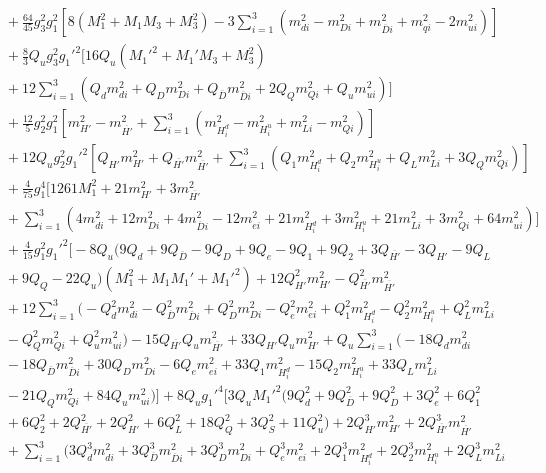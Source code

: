 \documentclass[preprint,amsmath,amssymb,aps,superscriptaddress,prd,showpacs,floatfix,nofootinbib]{revtex4-1}
\begin{document}
\begin{subequations}
\begin{align}
&{}+\frac{64}{45}g_3^2g_1^2\left [ 8\left (M_1^2+M_1M_3+M_3^2\right )-3\sum_{i=1}^3\left ( m_{di}^2-m_{Di}^2+m_{\overline{D}i}^2+m_{qi}^2-2m_{ui}^2\right )\right ]\nonumber\\
&{}+\frac{8}{3}Q_ug_3^2g_1'^2\bigg [ 16Q_u\left (M_1'^2+M_1'M_3+M_3^2\right )\nonumber\\
&{}+12\sum_{i=1}^3\left ( Q_dm_{di}^2+Q_Dm_{Di}^2+Q_{\overline{D}}m_{\overline{D}i}^2+2Q_Qm_{Qi}^2+Q_um_{ui}^2\right )\bigg ]\nonumber\\
&{}+\frac{12}{5}g_2^2g_1^2\left [ m_{H'}^2-m_{\overline{H'}}^2+\sum_{i=1}^3\left ( m_{H_i^d}^2-m_{H_i^u}^2+m_{Li}^2-m_{Qi}^2\right )\right ]\nonumber\\
&{}+12Q_ug_2^2g_1'^2\left [ Q_{H'}m_{H'}^2+Q_{\overline{H'}}m_{\overline{H'}}^2+\sum_{i=1}^3\left ( Q_1m_{H_i^d}^2+Q_2m_{H_i^u}^2+Q_Lm_{Li}^2+3Q_Qm_{Qi}^2\right )\right ]\nonumber\\
&{}+\frac{4}{75}g_1^4\bigg [ 1261M_1^2+21m_{H'}^2+3m_{\overline{H'}}^2\nonumber\\
&{}+\sum_{i=1}^3\left ( 4m_{di}^2+12m_{Di}^2+4m_{\overline{D}i}^2-12m_{ei}^2+21m_{H_i^d}^2+3m_{H_i^u}^2+21m_{Li}^2+3m_{Qi}^2+64m_{ui}^2\right )\bigg ]\nonumber\\
&{}+\frac{4}{15}g_1^2g_1'^2\bigg [ -8Q_u\big ( 9Q_d+9Q_{\overline{D}}-9Q_D+9Q_e-9Q_1+9Q_2+3Q_{\overline{H'}}-3Q_{H'}-9Q_L\nonumber\\
&{}+9Q_Q-22Q_u\big )\left ( M_1^2+M_1M_1'+M_1'^2 \right )+12Q_{H'}^2m_{H'}^2-Q_{\overline{H'}}^2m_{\overline{H'}}^2\nonumber\\
&{}+12\sum_{i=1}^3\big ( -Q_d^2m_{di}^2-Q_{\overline{D}}^2m_{\overline{D}i}^2+Q_D^2m_{Di}^2-Q_e^2m_{ei}^2+Q_1^2m_{H_i^d}^2-Q_2^2m_{H_i^u}^2+Q_L^2m_{Li}^2\nonumber\\
&{}-Q_Q^2m_{Qi}^2+Q_u^2m_{ui}^2\big )-15Q_{\overline{H'}}Q_um_{\overline{H'}}^2+33Q_{H'}Q_um_{H'}^2+Q_u\sum_{i=1}^3\big ( -18Q_dm_{di}^2\nonumber\\
&{}-18Q_{\overline{D}}m_{\overline{D}i}^2+30Q_Dm_{Di}^2-6Q_em_{ei}^2+33Q_1m_{H_i^d}^2-15Q_2m_{H_i^u}^2+33Q_Lm_{Li}^2\nonumber\\
&{}-21Q_Qm_{Qi}^2+84Q_um_{ui}^2\big )\bigg ]+8Q_ug_1'^4\bigg [ 3Q_uM_1'^2\big ( 9Q_d^2+9Q_{\overline{D}}^2+9Q_D^2+3Q_e^2+6Q_1^2\nonumber\\
&{}+6Q_2^2+2Q_{\overline{H'}}^2+2Q_{H'}^2+6Q_L^2+18Q_Q^2+3Q_S^2+11Q_u^2 \big )+2Q_{H'}^3m_{H'}^2+2Q_{\overline{H'}}^3m_{\overline{H'}}^2\nonumber\\
&{}+\sum_{i=1}^3\big ( 3Q_d^3m_{di}^2+3Q_{\overline{D}}^3m_{\overline{D}i}^2+3Q_D^3m_{Di}^2+Q_e^3m_{ei}^2+2Q_1^3m_{H_i^d}^2+2Q_2^3m_{H_i^u}^2+2Q_L^3m_{Li}^2\nonumber\\

\end{align}
\end{subequations}
\end{document}
